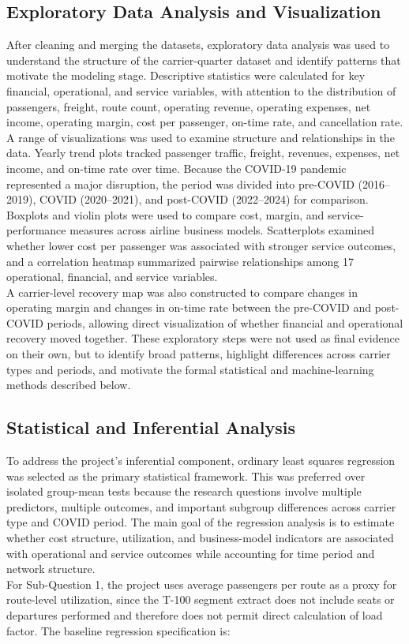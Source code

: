\documentclass[11pt, letterpaper]{article}
\begin{document}
\subsection{Exploratory Data Analysis and Visualization}
After cleaning and merging the datasets, exploratory data analysis was used to understand the structure of the carrier-quarter dataset and identify patterns that motivate the modeling stage. Descriptive statistics were calculated for key financial, operational, and service variables, with attention to the distribution of passengers, freight, route count, operating revenue, operating expenses, net income, operating margin, cost per passenger, on-time rate, and cancellation rate.\\
\indent A range of visualizations was used to examine structure and relationships in the data. Yearly trend plots tracked passenger traffic, freight, revenues, expenses, net income, and on-time rate over time. Because the COVID-19 pandemic represented a major disruption, the period was divided into pre-COVID (2016--2019), COVID (2020--2021), and post-COVID (2022--2024) for comparison. Boxplots and violin plots were used to compare cost, margin, and service-performance measures across airline business models. Scatterplots examined whether lower cost per passenger was associated with stronger service outcomes, and a correlation heatmap summarized pairwise relationships among 17 operational, financial, and service variables.\\
\indent A carrier-level recovery map was also constructed to compare changes in operating margin and changes in on-time rate between the pre-COVID and post-COVID periods, allowing direct visualization of whether financial and operational recovery moved together. These exploratory steps were not used as final evidence on their own, but to identify broad patterns, highlight differences across carrier types and periods, and motivate the formal statistical and machine-learning methods described below.

\subsection{Statistical and Inferential Analysis}
To address the project's inferential component, ordinary least squares regression was selected as the primary statistical framework. This was preferred over isolated group-mean tests because the research questions involve multiple predictors, multiple outcomes, and important subgroup differences across carrier type and COVID period. The main goal of the regression analysis is to estimate whether cost structure, utilization, and business-model indicators are associated with operational and service outcomes while accounting for time period and network structure.\\
\indent For Sub-Question 1, the project uses average passengers per route as a proxy for route-level utilization, since the T-100 segment extract does not include seats or departures performed and therefore does not permit direct calculation of load factor. The baseline regression specification is:
\end{document}
